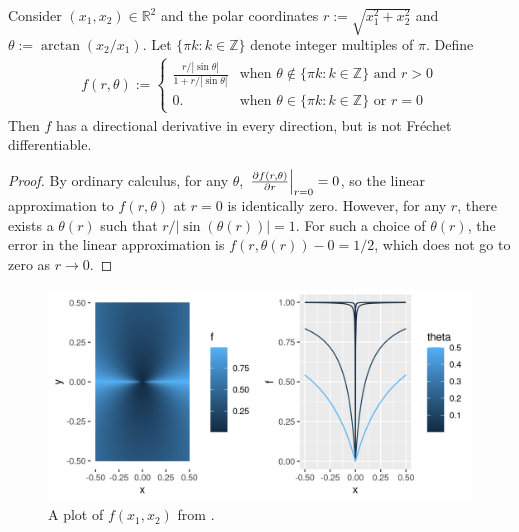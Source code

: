\begin{ex}
%
Consider $(x_1, x_2) \in \mathbb{R}^2$ and the polar coordinates $r :=
\sqrt{x_1^2 + x_2^2}$ and $\theta := \arctan(x_2 / x_1)$.  Let $\{\pi k: k \in
\mathbb{Z} \}$ denote integer multiples of $\pi$.  Define
%
\begin{align*}
%
f(r, \theta) := \begin{cases}
\frac{r / | \sin \theta |}{1 + r / | \sin \theta |}
    & \textrm{when } \theta \notin \{\pi k: k \in \mathbb{Z}\}
    \textrm{ and } r > 0 \\
0. & \textrm{when } \theta \in \{\pi k: k \in \mathbb{Z}
    \} \textrm{ or }r = 0
%
\end{cases}
%
\end{align*}
%
Then $f$ has a directional derivative in every direction, but is not Fr{\'e}chet
differentiable.
%
\begin{proof}
%
By ordinary calculus, for any $\theta$, $\left.\frac{\partial f(r, \theta)}{\partial
r}\right\vert_{r=0} = 0$, so the linear approximation to $f(r, \theta)$ at $r=0$ is
identically zero.  However, for any $r$, there exists a $\theta(r)$ such that
$r / |\sin(\theta(r))| = 1$.  For such a choice of $\theta(r)$, the error in
the linear approximation is $f(r, \theta(r)) - 0 = 1/2$, which does not go
to zero as $r \rightarrow 0$.
%
\end{proof}
%
\end{ex}
%
\begin{figure}[h!]

\includegraphics[width=0.980\linewidth,height=0.490\linewidth]{static_images/pathological_r2_example.png}
\caption{A plot of $f(x_1, x_2)$ from .}
\centering
\end{figure}



